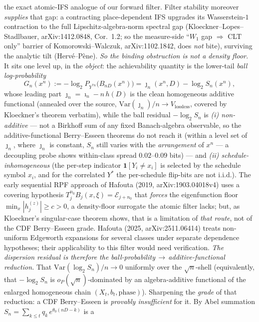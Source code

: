 \documentclass[
]{article}
\begin{document}
the exact atomic-IFS analogue of our forward filter. Filter stability moreover \emph{supplies} that gap:
a contracting place-dependent IFS upgrades its Wasserstein-$1$ contraction to the full
Lipschitz-algebra-norm spectral gap (Kloeckner--Lopes--Stadlbauer, arXiv:1412.0848, Cor.~1.2; so the
measure-side ``$W_1$ gap $\Rightarrow$ CLT only'' barrier of Komorowski--Walczuk, arXiv:1102.1842, does
\emph{not} bite), surviving the analytic tilt (Herv\'e--P\`ene). \emph{So the binding obstruction is not
a density floor.} It sits one level up, in the \emph{object}: the achievability quantity is the
lower-tail \emph{ball log-probability}
\[
  G_n(x^n):=-\log_2 P_{Y^{*n}}\!\big(B_{nD}(x^n)\big)=\jmath_n(x^n,D)-\log_2 S_n(x^n),
\]
whose leading part $\jmath_n=\imath_n-n\,h(D)$ is the clean homogeneous additive functional (annealed
over the source, $\mathrm{Var}(\jmath_n)/n\to V_{\mathrm{lossless}}$, covered by Kloeckner's theorem
verbatim), while the ball residual $-\log_2 S_n$ is \emph{(i) non-additive} --- not a Birkhoff sum of
any fixed Banach-algebra observable, so the additive-functional Berry--Esseen theorems do not reach it
(within a level set of $\jmath_n$, where $\jmath_n$ is constant, $S_n$ still varies with the
\emph{arrangement} of $x^n$ --- a decoupling probe shows within-class spread $0.02$--$0.09$ bits) ---
and \emph{(ii) schedule-inhomogeneous} (the per-step indicator $\mathbf 1[Y_i\ne x_i]$ is selected by
the schedule symbol $x_i$, and for the correlated $Y^*$ the per-schedule flip-bits are not i.i.d.). The
early sequential RPF approach of Hafouta (2019, arXiv:1903.04018v4)
uses a covering hypothesis
$T_j^{n_0}B_j(x,\xi)=\mathcal E_{j+n_0}$ that \emph{forces} the eigenfunction floor
$\min_x|h_j^{(z)}|\ge c>0$, a density-floor surrogate the atomic filter lacks; but, as Kloeckner's
singular-case theorem shows, that is a limitation of \emph{that route}, not of the CDF Berry--Esseen
grade. Hafouta (2025, arXiv:2511.06414) treats non-uniform Edgeworth
expansions for several classes under separate dependence hypotheses;
their applicability to this filter would need verification.
\emph{The dispersion residual is therefore the ball-probability$\,\to\,$additive-functional reduction.}
That $\mathrm{Var}(\log_2 S_n)/n\to0$ uniformly over the $\sqrt n$-shell (equivalently, that $-\log_2
S_n$ is $o_P(\sqrt n)$-dominated by an algebra-additive functional of the enlarged homogeneous chain
$(X_t,b_t,\mathrm{phase})$). Sharpening the \emph{grade} of that reduction: a CDF Berry--Esseen is
\emph{provably insufficient} for it. By Abel summation $S_n=\sum_{k\le t}q_k\,e^{\theta_0(nD-k)}$ is a
\end{document}
